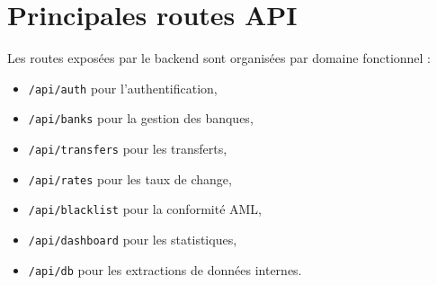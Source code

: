 \documentclass[a4paper,12pt]{report}
\begin{document}
\section{Principales routes API}
Les routes exposées par le backend sont organisées par domaine fonctionnel :
\begin{itemize}[leftmargin=*,nosep]
  \item \texttt{/api/auth} pour l'authentification,
  \item \texttt{/api/banks} pour la gestion des banques,
  \item \texttt{/api/transfers} pour les transferts,
  \item \texttt{/api/rates} pour les taux de change,
  \item \texttt{/api/blacklist} pour la conformité AML,
  \item \texttt{/api/dashboard} pour les statistiques,
  \item \texttt{/api/db} pour les extractions de données internes.
\end{itemize}
\end{document}
